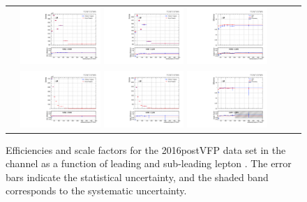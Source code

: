 \begin{figure}[htb]
  \begin{center}
    \begin{tabular}{ccc}
      \includegraphics[width=0.30\textwidth]{fig_2016postVFP_TrigSF/g_lepApt_mumu_MC.pdf}
      \includegraphics[width=0.30\textwidth]{fig_2016postVFP_TrigSF/g_lepApt_mumu_data.pdf}
      \includegraphics[width=0.30\textwidth]{fig_2016postVFP_TrigSF/g_mumu_lepApt_FullSystUncBand.pdf}\\
      \includegraphics[width=0.30\textwidth]{fig_2016postVFP_TrigSF/g_lepBpt_mumu_MC.pdf}
      \includegraphics[width=0.30\textwidth]{fig_2016postVFP_TrigSF/g_lepBpt_mumu_data.pdf}
      \includegraphics[width=0.30\textwidth]{fig_2016postVFP_TrigSF/g_mumu_lepBpt_FullSystUncBand.pdf}\\
    \end{tabular}
    \caption{Efficiencies and scale factors for the 2016postVFP data set in the \mumu channel as a function of leading and sub-leading lepton \pT.
            The error bars indicate the statistical uncertainty, and the shaded band corresponds to the systematic uncertainty.
            }
    \label{TrigSF_2016postVFP_3}
  \end{center}
\end{figure}

